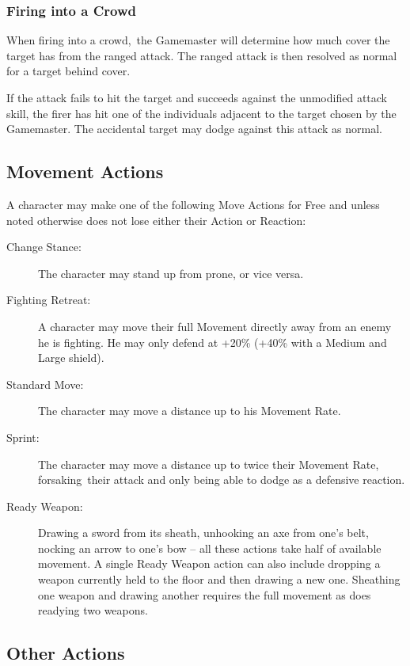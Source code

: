 \subsubsection{Firing into a Crowd}
When firing into a crowd, the Gamemaster will determine how much cover the target has from the ranged attack. The ranged attack is then resolved as normal for a target behind cover. 

If the attack fails to hit the target and succeeds against the unmodified attack skill, the firer has hit one of the individuals adjacent to the target chosen by the Gamemaster. The accidental target may dodge against this attack as normal. 


\subsection{Movement Actions}
A character may make one of the following Move Actions for Free and unless noted otherwise does not lose either their Action or Reaction:

\begin{description}
\item[Change Stance:] The character may stand up from prone, or vice versa.
\item[Fighting Retreat:] A character may move their full Movement directly away from an enemy he is fighting. He may only defend at +20\% (+40\% with a Medium and Large shield).
\item[Standard Move:] The character may move a distance up to his Movement Rate.
\item[Sprint:] The character may move a distance up to twice their Movement Rate, forsaking their attack and only being able to dodge as a defensive reaction.
\item[Ready Weapon:] Drawing a sword from its sheath, unhooking an axe from one’s belt, nocking an arrow to one’s bow – all these actions take half of available movement. A single Ready Weapon action can also include dropping a weapon currently held to the floor and then drawing a new one. Sheathing one weapon and drawing another requires the full movement as does readying two weapons. 
\end{description}


\subsection{Other Actions}

